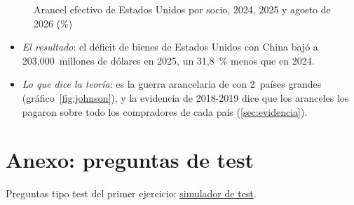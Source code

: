 \documentclass[11pt]{article}
\begin{document}
\begin{figure}[H]
\centering
\caption{Arancel efectivo de Estados Unidos por socio, 2024, 2025 y agosto de 2026 (\%)}\label{fig:arancel-efectivo-eeuu}
\end{figure}
\begin{itemize}
\item \emph{El resultado}: el déficit de bienes de Estados Unidos con China bajó a 203.000~millones de dólares en 2025, un 31,8~\% menos que en 2024\nocite{CensusBureau2026China}.
\item \emph{Lo que dice la teoría}: es la guerra arancelaria de  con 2~países grandes (gráfico~\ref{fig:johnson}), y la evidencia de 2018-2019 dice que los aranceles los pagaron sobre todo los compradores de cada país (\ref{sec:evidencia})\nocite{FajgelbaumKhandelwal2022Economic}.
\end{itemize}

\section{Anexo: preguntas de test}\label{anexo:test}

\begin{anotaciones}
Preguntas tipo test del primer ejercicio: \href{https://www.victorgutierrezmarcos.es/oposicion/temario/primer-ejercicio/test/simulador.html?tema=3.B.7}{simulador de test}.
\end{anotaciones}

\bibliografia
\end{document}
